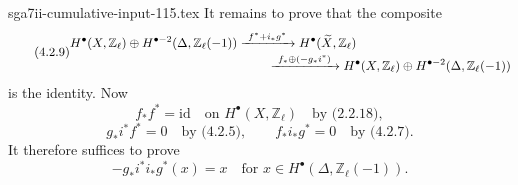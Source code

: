 \begin{filecontents*}{sga7ii-cumulative-input-115.tex}
It remains to prove that the composite
\begin{equation}\tag{4.2.9}
\begin{aligned}
&H^\bullet(X,\mathbb Z_\ell)\oplus
 H^{\bullet-2}(\Delta,\mathbb Z_\ell(-1))
 \xrightarrow{\ f^*+i_*g^*\ }
 H^\bullet(\widetilde X,\mathbb Z_\ell)\\[-2pt]
&\hspace{55mm}\xrightarrow{\ f_*\oplus(-g_*i^*)\ }
 H^\bullet(X,\mathbb Z_\ell)\oplus
 H^{\bullet-2}(\Delta,\mathbb Z_\ell(-1))
\end{aligned}
\end{equation}
is the identity.  Now
\[
f_*f^*=\mathrm{id}\quad\text{on }H^\bullet(X,\mathbb Z_\ell)
\quad\text{by (2.2.18)},
\]
\[
g_*i^*f^*=0\quad\text{by (4.2.5)},
\qquad
f_*i_*g^*=0\quad\text{by (4.2.7)}.
\]
It therefore suffices to prove
\begin{equation}\tag{4.2.10}
-g_*i^*i_*g^*(x)=x
\quad\text{for }x\in H^\bullet(\Delta,\mathbb Z_\ell(-1)).
\end{equation}


\end{filecontents*}
